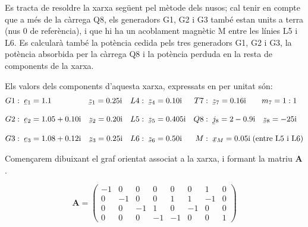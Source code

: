 \begin{exemple}\label{ex:XarxaAmbAcobl}
	\addcontentsxms{\XarxaAmbAcobl}
    Es tracta de resoldre la xarxa següent pel mètode dels nusos; cal
    tenir en compte que a més de la càrrega Q8, els generadors G1, G2 i
    G3 també estan units a terra (nus 0 de referència), i que hi ha un
    acoblament magnètic M entre les línies L5 i L6. Es calcularà també
    la potència cedida pels tres generadors G1, G2 i G3, la potència
    absorbida per la càrrega Q8 i la potència perduda en la resta de
    components de la xarxa.
    \begin{center}
       
    \end{center}

    Els valors dels components d'aquesta xarxa, expressats en per unitat són:
    \begin{align*}
       G1 &:\; \cmplx{e}_1 = \num{1,1} \qquad\qquad\;\;\, \cmplx{z}_1 = \complexnum{j 0,25} & L4 &:\; \cmplx{z}_4 = \complexnum{j 0,10} & T7 &:\; \cmplx{z}_7 = \complexnum{j 0,16} \quad\quad m_7=1:1\\*[3mm]
       G2 &:\; \cmplx{e}_2 = \complexnum{1,05+j0,10} \quad \cmplx{z}_2 = \complexnum{j 0,20} & L5 &:\; \cmplx{z}_5 = \complexnum{j 0,405}  & Q8 &:\; \cmplx{j}_8 = \complexnum{2-j0,9} \quad \cmplx{z}_8 = \complexnum{-j25} \\[3mm]
       G3 &:\; \cmplx{e}_3 = \complexnum{1,08+j0,12} \quad \cmplx{z}_3 = \complexnum{j 0,25} & L6 &:\; \cmplx{z}_6 = \complexnum{j 0,50} & M &:\; \cmplx{x}_M = \complexnum{j0,05}\; \text{(entre L5 i L6)}
    \end{align*}

    Començarem dibuixant el graf orientat associat a la xarxa, i formant la matriu $\boldsymbol{A}$.
    \begin{center}
         
    \end{center}

    \[
       \boldsymbol{A} = \left( \begin{array}{rrrrrrrr}
         -1 & 0 & 0 & 0 & 0 & 0 & 1 & 0 \\
         0 & -1 & 0 & 0 & 1 & 1 & -1 & 0 \\
         0 & 0 & -1 & 1 & 0 & -1 & 0 & 0 \\
         0 & 0 & 0 & -1 & -1 & 0 & 0 & 1
       \end{array}\right)
    \]


\end{exemple}
